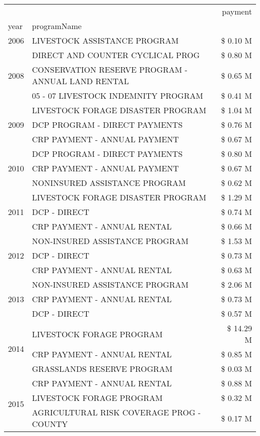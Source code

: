 \begin{tabular}{llr}
\toprule
 &  & payment \\
year & programName &  \\
\midrule
2006 & LIVESTOCK ASSISTANCE PROGRAM & \$ 0.10 M \\
\cline{1-3}
\multirow[t]{3}{*}{2008} & DIRECT AND COUNTER CYCLICAL PROG & \$ 0.80 M \\
 & CONSERVATION RESERVE PROGRAM - ANNUAL LAND RENTAL & \$ 0.65 M \\
 & 05 - 07 LIVESTOCK INDEMNITY PROGRAM & \$ 0.41 M \\
\cline{1-3}
\multirow[t]{3}{*}{2009} & LIVESTOCK FORAGE DISASTER  PROGRAM & \$ 1.04 M \\
 & DCP PROGRAM - DIRECT PAYMENTS & \$ 0.76 M \\
 & CRP PAYMENT - ANNUAL PAYMENT & \$ 0.67 M \\
\cline{1-3}
\multirow[t]{3}{*}{2010} & DCP PROGRAM - DIRECT PAYMENTS & \$ 0.80 M \\
 & CRP PAYMENT - ANNUAL PAYMENT & \$ 0.67 M \\
 & NONINSURED ASSISTANCE PROGRAM & \$ 0.62 M \\
\cline{1-3}
\multirow[t]{3}{*}{2011} & LIVESTOCK FORAGE DISASTER PROGRAM & \$ 1.29 M \\
 & DCP - DIRECT & \$ 0.74 M \\
 & CRP PAYMENT - ANNUAL RENTAL & \$ 0.66 M \\
\cline{1-3}
\multirow[t]{3}{*}{2012} & NON-INSURED ASSISTANCE PROGRAM & \$ 1.53 M \\
 & DCP - DIRECT & \$ 0.73 M \\
 & CRP PAYMENT - ANNUAL RENTAL & \$ 0.63 M \\
\cline{1-3}
\multirow[t]{3}{*}{2013} & NON-INSURED ASSISTANCE PROGRAM & \$ 2.06 M \\
 & CRP PAYMENT - ANNUAL RENTAL & \$ 0.73 M \\
 & DCP - DIRECT & \$ 0.57 M \\
\cline{1-3}
\multirow[t]{3}{*}{2014} & LIVESTOCK FORAGE PROGRAM & \$ 14.29 M \\
 & CRP PAYMENT - ANNUAL RENTAL & \$ 0.85 M \\
 & GRASSLANDS RESERVE PROGRAM & \$ 0.03 M \\
\cline{1-3}
\multirow[t]{3}{*}{2015} & CRP PAYMENT - ANNUAL RENTAL & \$ 0.88 M \\
 & LIVESTOCK FORAGE PROGRAM & \$ 0.32 M \\
 & AGRICULTURAL RISK COVERAGE PROG - COUNTY & \$ 0.17 M \\

\end{tabular}
